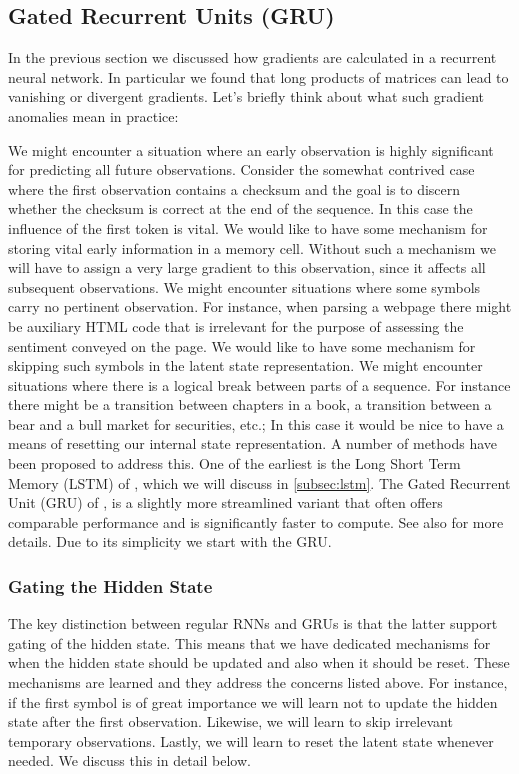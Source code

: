 \subsection{Gated Recurrent Units (GRU)}

In the previous section we discussed how gradients are calculated in a recurrent neural network. In particular we found that long products of matrices can lead to vanishing or divergent gradients. Let’s briefly think about what such gradient anomalies mean in practice:

We might encounter a situation where an early observation is highly significant for predicting all future observations. Consider the somewhat contrived case where the first observation contains a checksum and the goal is to discern whether the checksum is correct at the end of the sequence. In this case the influence of the first token is vital. We would like to have some mechanism for storing vital early information in a memory cell. Without such a mechanism we will have to assign a very large gradient to this observation, since it affects all subsequent observations.
We might encounter situations where some symbols carry no pertinent observation. For instance, when parsing a webpage there might be auxiliary HTML code that is irrelevant for the purpose of assessing the sentiment conveyed on the page. We would like to have some mechanism for skipping such symbols in the latent state representation.
We might encounter situations where there is a logical break between parts of a sequence. For instance there might be a transition between chapters in a book, a transition between a bear and a bull market for securities, etc.; In this case it would be nice to have a means of resetting our internal state representation.
A number of methods have been proposed to address this. One of the earliest is the Long Short Term Memory (LSTM) of \citep{Hochreiter1997}, which we will discuss in \cref{subsec:lstm}. The Gated Recurrent Unit (GRU) of \citet{Cho2014}, is a slightly more streamlined variant that often offers comparable performance and is significantly faster to compute. See also \citep{Chung2014} for more details. Due to its simplicity we start with the GRU.

\subsubsection{Gating the Hidden State}

The key distinction between regular RNNs and GRUs is that the latter support gating of the hidden state. This means that we have dedicated mechanisms for when the hidden state should be updated and also when it should be reset. These mechanisms are learned and they address the concerns listed above. For instance, if the first symbol is of great importance we will learn not to update the hidden state after the first observation. Likewise, we will learn to skip irrelevant temporary observations. Lastly, we will learn to reset the latent state whenever needed. We discuss this in detail below.

